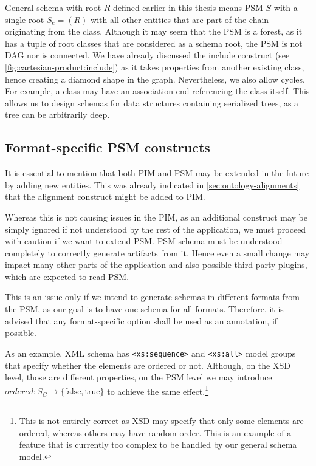General schema with root $R$ defined earlier in this thesis means PSM $S$ with a single root $S_{\textrm{c}} = (R)$ with all other entities that are part of the chain originating from the class. Although it may seem that the PSM is a forest, as it has a tuple of root classes that are considered as a schema root, the PSM is not DAG nor is connected. We have already discussed the include construct (see \autoref{fig:cartesian-product:include}) as it takes properties from another existing class, hence creating a diamond shape in the graph. Nevertheless, we also allow cycles. For example, a class may have an association end referencing the class itself. This allows us to design schemas for data structures containing serialized trees, as a tree can be arbitrarily deep.

\subsection{Format-specific PSM constructs}

It is essential to mention that both PIM and PSM may be extended in the future by adding new entities. This was already indicated in \autoref{sec:ontology-alignments} that the alignment construct might be added to PIM.

Whereas this is not causing issues in the PIM, as an additional construct may be simply ignored if not understood by the rest of the application, we must proceed with caution if we want to extend PSM. PSM schema must be understood completely to correctly generate artifacts from it. Hence even a small change may impact many other parts of the application and also possible third-party plugins, which are expected to read PSM.

This is an issue only if we intend to generate schemas in different formats from the PSM, as our goal is to have one schema for all formats. Therefore, it is advised that any format-specific option shall be used as an annotation, if possible.

As an example, XML schema has \verb|<xs:sequence>| and \verb|<xs:all>| model groups that specify whether the elements are ordered or not. Although, on the XSD level, those are different properties, on the PSM level we may introduce $ordered: S_C \rightarrow \{\textrm{false}, \textrm{true}\}$ to achieve the same effect.\footnote{This is not entirely correct as XSD may specify that only some elements are ordered, whereas others may have random order. This is an example of a feature that is currently too complex to be handled by our general schema model.}

